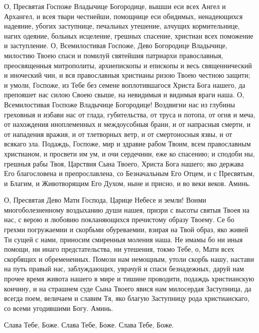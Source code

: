 О, Пресвятая Госпоже Владычице Богородице, вышши еси всех Ангел и Архангел, и всея твари честнейши, помощнице еси обидимых, ненадеющихся надеяние, убогих заступнице, печальных утешение, алчущих кормительнице, нагих одеяние, больных исцеление, грешных спасение, христиан всех поможение и заступление. О, Всемилостивая Госпоже, Дево Богородице Владычице, милостию Твоею спаси и помилуй святейшия патриархи православныя, преосвященныя митрополиты, архиепископы и епископы и весь священнический и иноческий чин, и вся православныя христианы ризою Твоею честною защити; и умоли, Госпоже, из Тебе без семене воплотившагося Христа Бога нашего, да препояшет нас силою Своею свыше, на невидимыя и видимыя враги наша. О, Всемилостивая Госпоже Владычице Богородице! Воздвигни нас из глубины греховныя и избави нас от глада, губительства, от труса и потопа, от огня и меча, от нахождения иноплеменных и междоусобныя брани, и от напрасныя смерти, и от нападения вражия, и от тлетворных ветр, и от смертоносныя язвы, и от всякаго зла. Подаждь, Госпоже, мир и здравие рабом Твоим, всем православным христианом, и просвети им ум, и очи сердечнии, еже ко спасению; и сподоби ны, грешныя рабы Твоя, Царствия Сына Твоего, Христа Бога нашего; яко держава Его благословена и препрославлена, со Безначальным Его Отцем, и с Пресвятым, и Благим, и Животворящим Его Духом, ныне и присно, и во веки веков. Аминь.


О, Пресвятая Дево Мати Господа, Царице Небесе и земли! Вонми многоболезненному воздыханию души нашея, призри с высоты святыя Твоея на нас, с верою и любовию покланяющихся пречистому образу Твоему. Се бо грехми погружаемии и скорбьми обуреваемии, взирая на Твой образ, яко живей Ти сущей с нами, приносим смиренныя моления наша. Не имамы бо ни иныя помощи, ни инаго предстательства, ни утешения, токмо Тебе, о, Мати всех скорбящих и обремененных. Помози нам немощным, утоли скорбь нашу, настави на путь правый нас, заблуждающих, уврачуй и спаси безнадежных, даруй нам прочее время живота нашего в мире и тишине проводити, подаждь христианскую кончину, и на страшнем суде Сына Твоего явися нам милосердая Заступница, да всегда поем, величаем и славим Тя, яко благую Заступницу рода христианскаго, со всеми угодившими Богу. Аминь.

\mychapterending

 


Слава Тебе, Боже. Слава Тебе, Боже. Слава Тебе, Боже.




